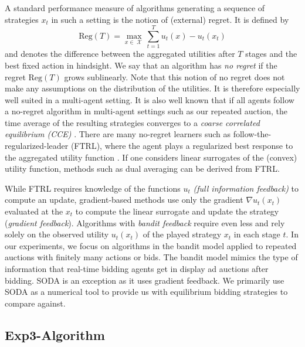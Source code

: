 \documentclass{article}
\DeclareMathOperator{\Xcal}{\mathcal{X}}
\begin{document}
A standard performance measure of algorithms generating a sequence of strategies $x_t$ in such a setting is the notion of (external) regret. It is defined by
\begin{equation}
	\text{Reg}(T) = \max_{x \in \Xcal} \sum_{t=1}^T u_t(x) - u_t(x_t)
\end{equation}
and denotes the difference between the aggregated utilities after $T$ stages and the best fixed action in hindsight. We say that an algorithm has \textit{no regret} if the regret $ \text{Reg}(T)$ grows sublinearly. 
Note that this notion of no regret does not make any assumptions on the distribution of the utilities. 
It is therefore especially well suited in a multi-agent setting. 
It is also well known that if all agents follow a no-regret algorithm in multi-agent settings such as our repeated auction, the time average of the resulting strategies converges to a \textit{coarse correlated equilibrium (CCE)} \citep{blum2007ExternalInternalRegret}. There are many no-regret learners such as follow-the-regularized-leader (FTRL), where the agent plays a regularized best response to the aggregated utility function \citep{shalev-shwartzOnlineLearningOnline2011}. If one considers linear surrogates of the (convex) utility function, methods such as dual averaging \citep{nesterov2009PrimaldualSubgradientMethods} can be derived from FTRL.

While FTRL requires knowledge of the functions $u_t$ \textit{(full information feedback)} to compute an update, gradient-based methods use only the gradient $\nabla u_t(x_t)$ evaluated at the $x_t$ to compute the linear surrogate and update the strategy (\textit{gradient feedback}). 
Algorithms with \textit{bandit feedback} require even less and rely solely on the observed utility $u_t(x_t)$ of the played strategy $x_t$ in each stage $t$.
In our experiments, we focus on algorithms in the bandit model applied to repeated auctions with finitely many actions or bids. 
The bandit model mimics the type of information that real-time bidding agents get in display ad auctions after bidding. SODA is an exception as it uses gradient feedback. We primarily use SODA as a numerical tool to provide us with equilibrium bidding strategies to compare against. 

\subsection{Exp3-Algorithm}
\end{document}
